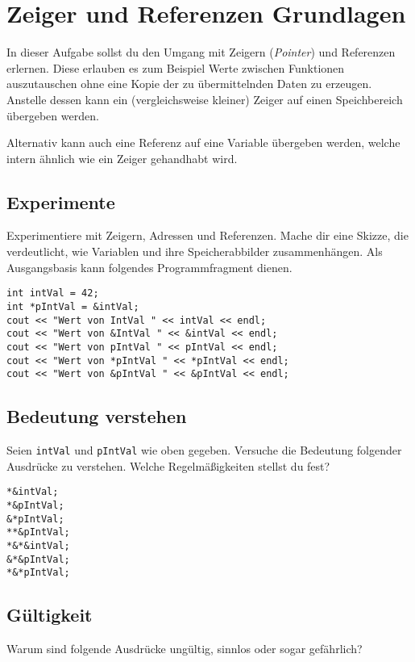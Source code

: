 \section{Zeiger und Referenzen Grundlagen}
In dieser Aufgabe sollst du den Umgang mit Zeigern (\emph{Pointer}) und Referenzen erlernen.
Diese erlauben es zum Beispiel Werte zwischen Funktionen auszutauschen ohne eine Kopie der zu übermittelnden Daten zu erzeugen.
Anstelle dessen kann ein (vergleichsweise kleiner) Zeiger auf einen Speichbereich übergeben werden.

Alternativ kann auch eine Referenz auf eine Variable übergeben werden, welche intern ähnlich wie ein Zeiger gehandhabt wird.

\subsection{Experimente}
Experimentiere mit Zeigern, Adressen und Referenzen.
Mache dir eine Skizze, die verdeutlicht, wie Variablen und ihre Speicherabbilder zusammenhängen.
Als Ausgangsbasis kann folgendes Programmfragment dienen.

\begin{lstlisting}
int intVal = 42;
int *pIntVal = &intVal;
cout << "Wert von IntVal " << intVal << endl;
cout << "Wert von &IntVal " << &intVal << endl;
cout << "Wert von pIntVal " << pIntVal << endl;
cout << "Wert von *pIntVal " << *pIntVal << endl;
cout << "Wert von &pIntVal " << &pIntVal << endl;
\end{lstlisting}

\subsection{Bedeutung verstehen}
Seien \texttt{intVal} und \texttt{pIntVal} wie oben gegeben.
Versuche die Bedeutung folgender Ausdrücke zu verstehen.
Welche Regelmäßigkeiten stellst du fest?

\begin{lstlisting}
*&intVal;
*&pIntVal;
&*pIntVal;
**&pIntVal;
*&*&intVal;
&*&pIntVal;
*&*pIntVal;
\end{lstlisting}



\subsection{Gültigkeit}
Warum sind folgende Ausdrücke ungültig, sinnlos oder sogar gefährlich?

